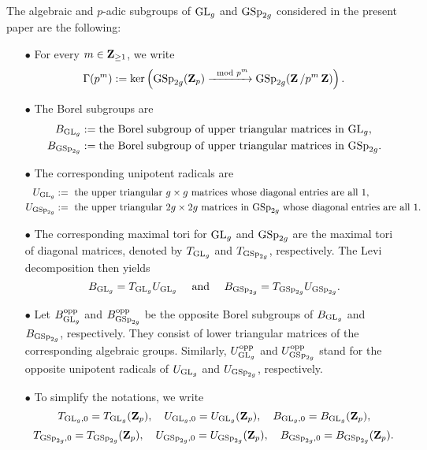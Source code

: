 The algebraic and $p$-adic subgroups of $\operatorname{GL}_g$ and $\operatorname{GSp}_{2g}$ considered in the present paper are the following:\begin{enumerate}
    \item[$\bullet$] For every $m\in \operatorname{\mathbf{Z}}_{\geq 1}$, we write $$\Gamma(p^m):=\ker\left(\operatorname{GSp}_{2g}(\operatorname{\mathbf{Z}}_p)\xrightarrow{\mod p^m}\operatorname{GSp}_{2g}(\operatorname{\mathbf{Z}}/p^m\operatorname{\mathbf{Z}})\right).$$

    \item[$\bullet$] The Borel subgroups are \begin{align*}
        B_{\operatorname{GL}_g} & := \text{the Borel subgroup of upper triangular matrices in $\operatorname{GL}_g$},\\
        B_{\operatorname{GSp}_{2g}} & := \text{the Borel subgroup of upper triangular matrices in $\operatorname{GSp}_{2g}$.}
    \end{align*}
    
    \item[$\bullet$] The corresponding unipotent radicals are \begin{align*}
        U_{\operatorname{GL}_g} & := \text{ the upper triangular $g\times g$ matrices whose diagonal entries are all $1$},\\
        U_{\operatorname{GSp}_{2g}} & := \text{ the upper triangular $2g\times 2g$ matrices in $\operatorname{GSp}_{2g}$ whose diagonal entries are all $1$}.
    \end{align*} 
    
    \item[$\bullet$] The corresponding maximal tori for $\operatorname{GL}_g$ and $\operatorname{GSp}_{2g}$ are the maximal tori of diagonal matrices, denoted by $T_{\operatorname{GL}_g}$ and $T_{\operatorname{GSp}_{2g}}$, respectively. The Levi decomposition then yields $$B_{\operatorname{GL}_g}=T_{\operatorname{GL}_g}U_{\operatorname{GL}_g}\quad \text{ and }\quad B_{\operatorname{GSp}_{2g}}=T_{\operatorname{GSp}_{2g}}U_{\operatorname{GSp}_{2g}}.$$
    
    \item[$\bullet$] Let $B_{\operatorname{GL}_g}^{\operatorname{opp}}$ and $B_{\operatorname{GSp}_{2g}}^{\operatorname{opp}}$ be the opposite Borel subgroups of $B_{\operatorname{GL}_g}$ and $B_{\operatorname{GSp}_{2g}}$, respectively. They consist of lower triangular matrices of the corresponding algebraic groups. Similarly, $U_{\operatorname{GL}_g}^{\operatorname{opp}}$ and $U_{\operatorname{GSp}_{2g}}^{\operatorname{opp}}$ stand for the opposite unipotent radicals of $U_{\operatorname{GL}_g}$ and $U_{\operatorname{GSp}_{2g}}$, respectively. 
    
    \item[$\bullet$] To simplify the notations, we write $$T_{\operatorname{GL}_g, 0}=T_{\operatorname{GL}_g}(\operatorname{\mathbf{Z}}_p),\quad U_{\operatorname{GL}_g, 0}=U_{\operatorname{GL}_g}(\operatorname{\mathbf{Z}}_p), \quad B_{\operatorname{GL}_g, 0}=B_{\operatorname{GL}_g}(\operatorname{\mathbf{Z}}_p),$$
$$T_{\operatorname{GSp}_{2g}, 0}=T_{\operatorname{GSp}_{2g}}(\operatorname{\mathbf{Z}}_p),\quad U_{\operatorname{GSp}_{2g}, 0}=U_{\operatorname{GSp}_{2g}}(\operatorname{\mathbf{Z}}_p),\quad B_{\operatorname{GSp}_{2g}, 0}=B_{\operatorname{GSp}_{2g}}(\operatorname{\mathbf{Z}}_p).$$ 


\end{enumerate}
